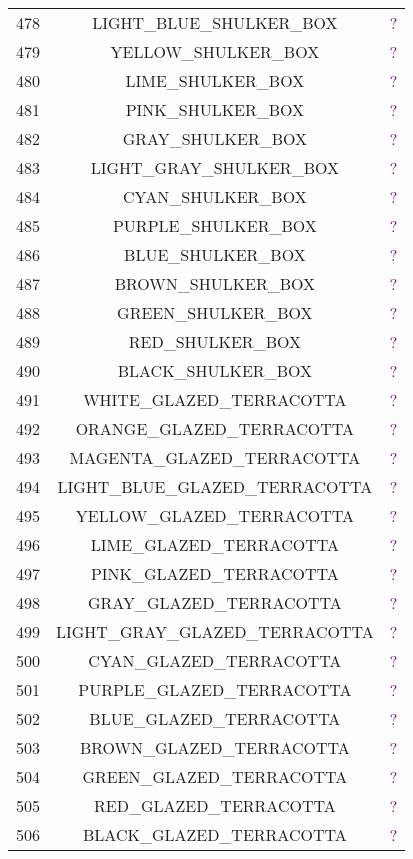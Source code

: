 \documentclass[11pt]{article}
\newcommand\myworries[1]{\textcolor{purple}{#1}}
\begin{document}
\begin{longtable}{ |c|c|c| }
	478 & LIGHT\_BLUE\_SHULKER\_BOX & \myworries{?} \\
	479 & YELLOW\_SHULKER\_BOX & \myworries{?} \\
	480 & LIME\_SHULKER\_BOX & \myworries{?} \\
	481 & PINK\_SHULKER\_BOX & \myworries{?} \\
	482 & GRAY\_SHULKER\_BOX & \myworries{?} \\
	483 & LIGHT\_GRAY\_SHULKER\_BOX & \myworries{?} \\
	484 & CYAN\_SHULKER\_BOX & \myworries{?} \\
	485 & PURPLE\_SHULKER\_BOX & \myworries{?} \\
	486 & BLUE\_SHULKER\_BOX & \myworries{?} \\
	487 & BROWN\_SHULKER\_BOX & \myworries{?} \\
	488 & GREEN\_SHULKER\_BOX & \myworries{?} \\
	489 & RED\_SHULKER\_BOX & \myworries{?} \\
	490 & BLACK\_SHULKER\_BOX & \myworries{?} \\
	491 & WHITE\_GLAZED\_TERRACOTTA & \myworries{?} \\
	492 & ORANGE\_GLAZED\_TERRACOTTA & \myworries{?} \\
	493 & MAGENTA\_GLAZED\_TERRACOTTA & \myworries{?} \\
	494 & LIGHT\_BLUE\_GLAZED\_TERRACOTTA & \myworries{?} \\
	495 & YELLOW\_GLAZED\_TERRACOTTA & \myworries{?} \\
	496 & LIME\_GLAZED\_TERRACOTTA & \myworries{?} \\
	497 & PINK\_GLAZED\_TERRACOTTA & \myworries{?} \\
	498 & GRAY\_GLAZED\_TERRACOTTA & \myworries{?} \\
	499 & LIGHT\_GRAY\_GLAZED\_TERRACOTTA & \myworries{?} \\
	500 & CYAN\_GLAZED\_TERRACOTTA & \myworries{?} \\
	501 & PURPLE\_GLAZED\_TERRACOTTA & \myworries{?} \\
	502 & BLUE\_GLAZED\_TERRACOTTA & \myworries{?} \\
	503 & BROWN\_GLAZED\_TERRACOTTA & \myworries{?} \\
	504 & GREEN\_GLAZED\_TERRACOTTA & \myworries{?} \\
	505 & RED\_GLAZED\_TERRACOTTA & \myworries{?} \\
	506 & BLACK\_GLAZED\_TERRACOTTA & \myworries{?} \\

\end{longtable}
\end{document}
